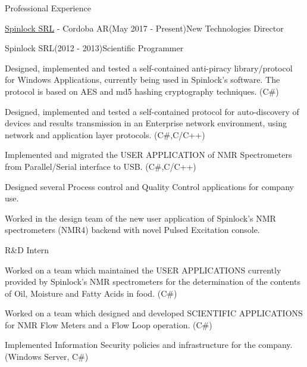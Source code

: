 \documentclass{resume}
\begin{document}
\begin{rSection}{Professional Experience}
\begin{rSubsection}{\href{https://spinlock.com.ar}{Spinlock SRL} - Cordoba AR}{(May 2017 - Present)}{New Technologies Director}{}
\begin{rSubsection}{Spinlock SRL}{(2012 - 2013)}{Scientific Programmer}{}
\item Designed, implemented and tested a self-contained anti-piracy library/protocol for Windows Applications, currently being used in Spinlock's software. The protocol is based on AES and md5 hashing cryptography techniques. (C\#)
\item Designed, implemented and tested a self-contained protocol for auto-discovery of devices and results transmission in an Enterprise network environment, using network and application layer protocols. (C\#,C/C++)
\item Implemented and migrated the USER APPLICATION of NMR Spectrometers from Parallel/Serial interface to USB. (C\#,C/C++)
\item Designed several Process control and Quality Control applications for company use.
\item Worked in the design team of the new user application of Spinlock's NMR spectrometers (NMR4) backend with novel Pulsed Excitation console.
\end{rSubsection}
\begin{rSubsection}{}{}{R\&D Intern}{}
\item Worked on a team which maintained the USER APPLICATIONS currently provided by Spinlock's NMR spectrometers for the determination of the contents of Oil, Moisture and Fatty Acids in food. (C\#)
\item Worked on a team which designed and developed SCIENTIFIC APPLICATIONS for NMR Flow Meters and a Flow Loop operation. (C\#)
\item Implemented Information Security policies and infrastructure for the company. (Windows Server, C\#)
\end{rSubsection}




\end{rSubsection}
\end{rSection}
\end{document}
